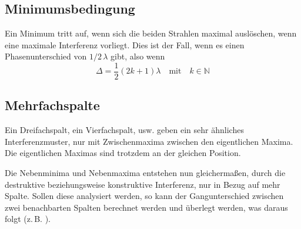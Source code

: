 \documentclass{article}
\begin{document}
\subsection{Minimumsbedingung}
Ein Minimum tritt auf, wenn sich die beiden Strahlen maximal auslöschen, wenn eine maximale Interferenz vorliegt. Dies ist der Fall, wenn es einen Phasenunterschied von $1/2 \,\lambda$ gibt, also wenn
\[
 \Delta = \frac{1}{2} \left(2k+1\right) \lambda
 \quad \text{mit} \quad
 k \in \mathbb{N}
\]
 
\subsection{Mehrfachspalte}
Ein Dreifachspalt, ein Vierfachspalt, usw. geben ein sehr ähnliches Interferenzmuster, nur mit Zwischenmaxima zwischen den eigentlichen Maxima. Die eigentlichen Maximas sind trotzdem an der gleichen Position.
 
Die Nebenminima und Nebenmaxima entstehen nun gleichermaßen, durch die destruktive beziehungsweise konstruktive Interferenz, nur in Bezug auf mehr Spalte. Sollen diese analysiert werden, so kann der Gangunterschied zwischen zwei benachbarten Spalten berechnet werden und überlegt werden, was daraus folgt (z.\,B. ).
 
\end{document}

